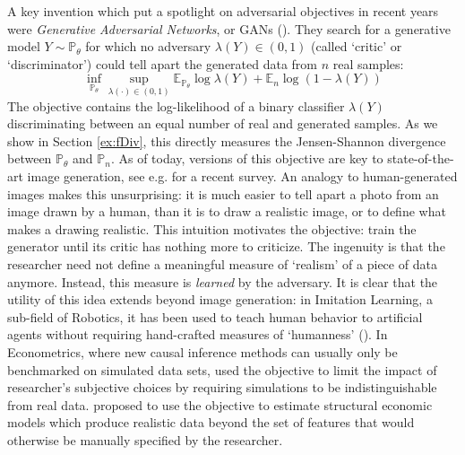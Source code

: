 \documentclass[12pt]{article}
\theoremstyle{myplain}
\theoremstyle{definition}
\theoremstyle{definition}
\theoremstyle{remark}
\numberwithin{equation}{section}
\begin{document}
A key invention which put a spotlight on adversarial objectives in recent years were \textit{Generative Adversarial Networks}, or GANs (\cite{goodfellow2014generative}). They search for a generative model $Y\sim\mathbb{P}_\theta$ for which no adversary $\lambda(Y)\in(0,1)$ (called `critic' or `discriminator') could tell apart the generated data from $n$ real samples:
$$\inf_{\mathbb{P}_\theta}\sup_{\lambda(\cdot)\in(0,1)} \mathbb{E}_{\mathbb{P}_\theta} \log\lambda(Y)+\mathbb{E}_n\log(1-\lambda(Y))$$
The objective contains the log-likelihood of a binary classifier $\lambda(Y)$ discriminating between an equal number of real and generated samples. As we show in Section \ref{ex:fDiv}, this directly measures the Jensen-Shannon divergence between $\mathbb{P}_\theta$ and $\mathbb{P}_n$. As of today, 
versions of this objective are key to state-of-the-art image generation, see e.g. \cite{Jabbar2022ASO} for a recent survey. An analogy to human-generated images makes this unsurprising: it is much easier to tell apart a photo from an image drawn by a human, than it is to draw a realistic image, or to define what makes a drawing realistic. This intuition motivates the objective: train the generator until its critic has nothing more to criticize. The ingenuity is that the researcher need not define a meaningful measure of `realism' of a piece of data anymore. Instead, this measure is \textit{learned} by the adversary. It is clear that the utility of this idea extends beyond image generation: in Imitation Learning, a sub-field of Robotics, it has been used to teach human behavior to artificial agents without requiring hand-crafted measures of `humanness' (\cite{gail}). In Econometrics, where new causal inference methods can usually only be benchmarked on simulated data sets, \cite{athey2019using} used the objective to limit the impact of researcher's subjective choices by requiring simulations to be indistinguishable from real data. \cite{kaji2020adversarial} proposed to use the objective to estimate structural economic models which produce realistic data beyond the set of features that would otherwise be manually specified by the researcher.\\
\end{document}
